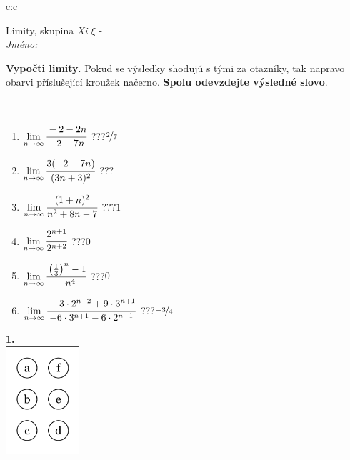 \documentclass[10pt]{report}
\begin{document}
\begin{tabular}{c:c}
\begin{minipage}[c][104.5mm][t]{0.5\linewidth}
\begin{center}
\vspace{7mm}
{\huge Limity, skupina \textit{Xi $\xi$} -}\\[5mm]
\textit{Jméno:}\phantom{xxxxxxxxxxxxxxxxxxxxxxxxxxxxxxxxxxxxxxxxxxxxxxxxxxxxxxxxxxxxxxxxx}\\[5mm]
\begin{minipage}{0.95\linewidth}
\begin{center}
\textbf{Vypočti limity}. Pokud se výsledky shodujú s tými za otazníky, tak napravo\\obarvi příslušející kroužek načerno. \textbf{Spolu odevzdejte výsledné slovo}.
\end{center}
\end{minipage}
\\[1mm]
\begin{minipage}{0.79\linewidth}
\begin{center}
\begin{varwidth}{\linewidth}
\begin{enumerate}
\normalsize
\item $\lim\limits_{n\to\infty}\cfrac{-2-2n}{-2-7n}$\quad \dotfill\; ???\;\dotfill \quad $\nicefrac{2}{7}$
\item $\lim\limits_{n\to\infty}\cfrac{3(-2-7n)}{(3n+3)^2}$\quad \dotfill\; ???\;\dotfill {}
\item $\lim\limits_{n\to\infty}\cfrac{(1+n)^2}{n^2+8n-7}$\quad \dotfill\; ???\;\dotfill \quad $1$
\item $\lim\limits_{n\to\infty}\cfrac{2^{n+1}}{2^{n+2}}$\quad \dotfill\; ???\;\dotfill \quad $0$
\item $\lim\limits_{n\to\infty}\cfrac{\left(\frac{1}{3}\right)^n -1}{-n^{4}}$\quad \dotfill\; ???\;\dotfill \quad $0$
\item $\lim\limits_{n\to\infty}\cfrac{-3\cdot 2^{n+2}+9\cdot 3^{n+1}}{-6\cdot 3^{n+1}-6\cdot 2^{n-1}}$\quad \dotfill\; ???\;\dotfill \quad $\nicefrac{-3}{4}$
\end{enumerate}
\end{varwidth}
\end{center}
\end{minipage}
\begin{minipage}{0.20\linewidth}
\begin{center}
{\Huge\bfseries 1.} \\[2mm]
\includegraphics[height=40mm]{../images/braille.png}

\end{center}
\end{minipage}
\end{center}
\end{minipage}
\end{tabular}
\end{document}
